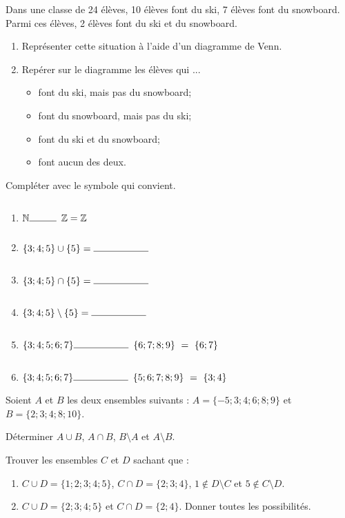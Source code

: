 \documentclass[a4paper,12pt]{article}
\begin{document}
\begin{activite}
	\tcblower
	\begin{tasks}
		\task Dans une classe de 24 élèves, 10 élèves font du ski, 7 élèves font du snowboard. Parmi ces élèves, 2 élèves font du ski et du snowboard.
\begin{enumerate}
	\item Représenter cette situation à l'aide d'un diagramme de Venn. 
	\item Repérer sur le diagramme les élèves qui ... 
		\begin{multicols}{2}
			\begin{itemize}
			\item font du ski, mais pas du snowboard;
			\item font du snowboard, mais pas du ski;
			\item font du ski et du snowboard;
			\item font aucun des deux.
		\end{itemize}
		\end{multicols}
\end{enumerate}
		\task Compléter avec le symbole qui convient.
		\begin{multicols}{2}			
\begin{enumerate}	
\item $\mathbb{N} \ligne{1} \mathbb{Z} = \mathbb{Z}$
\item $\{3;4;5\} \cup \{5\} = \ligne{2}$
\item $\{3;4;5\} \cap \{5\} = \ligne{2}$
\item $\{3;4;5\} \setminus \{5\} = \ligne{2}$
\item $\{3;4;5;6;7\} \ligne{2} \{6;7;8;9\}~=~\{6;7\}$
\item $\{3;4;5;6;7\} \ligne{2} \{5;6;7;8;9\}~=~\{3;4\}$
\end{enumerate}
		\end{multicols}
	\end{tasks}
	\end{activite}
	\begin{activite}
		\tcblower
		\begin{tasks}
	\task Soient $A$ et $B$ les deux ensembles suivants : $A = \{-5;3;4;6;8;9\}$ et $B = \{2;3;4;8;10\}$.

Déterminer $A \cup B$, $A \cap B$, $B \setminus A$ et $A \setminus B$.

\task Trouver les ensembles $C$ et $D$ sachant que :
\begin{enumerate}
\item $C \cup D = \{1;2;3;4;5\}$, $C \cap D = \{2;3;4\}$, $1 \notin D \setminus C$ et $5 \notin C \setminus D$.
\item $C \cup D = \{2;3;4;5\}$ et $C \cap D = \{2;4\}$. Donner toutes les possibilités.
\end{enumerate}
\end{tasks}
\end{activite}
\end{document}
